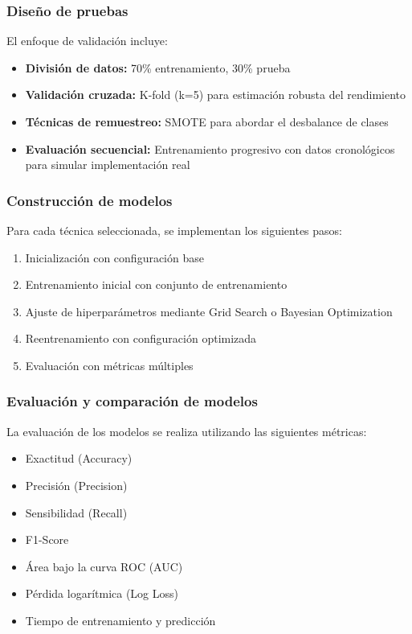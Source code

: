 \subsubsection{Diseño de pruebas}
El enfoque de validación incluye:

\begin{itemize}
    \item \textbf{División de datos:} 70\% entrenamiento, 30\% prueba
    \item \textbf{Validación cruzada:} K-fold (k=5) para estimación robusta del rendimiento
    \item \textbf{Técnicas de remuestreo:} SMOTE para abordar el desbalance de clases
    \item \textbf{Evaluación secuencial:} Entrenamiento progresivo con datos cronológicos para simular implementación real
\end{itemize}

\subsubsection{Construcción de modelos}
Para cada técnica seleccionada, se implementan los siguientes pasos:

\begin{enumerate}
    \item Inicialización con configuración base
    \item Entrenamiento inicial con conjunto de entrenamiento
    \item Ajuste de hiperparámetros mediante Grid Search o Bayesian Optimization
    \item Reentrenamiento con configuración optimizada
    \item Evaluación con métricas múltiples
\end{enumerate}

\subsubsection{Evaluación y comparación de modelos}
La evaluación de los modelos se realiza utilizando las siguientes métricas:

\begin{itemize}
    \item Exactitud (Accuracy)
    \item Precisión (Precision)
    \item Sensibilidad (Recall)
    \item F1-Score
    \item Área bajo la curva ROC (AUC)
    \item Pérdida logarítmica (Log Loss)
    \item Tiempo de entrenamiento y predicción
\end{itemize}

